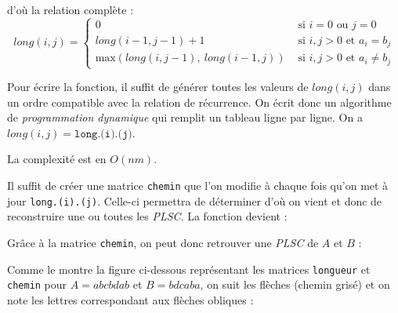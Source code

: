 d'où la relation complète :
\[
    long(i,j) = \begin{cases}
        0 & \textrm{ si } i=0 \textrm{ ou } j=0\\
        long(i-1, j-1) + 1 & \textrm{ si } i,j > 0 \textrm{ et } a_i=b_j\\
        \textrm{max}(long(i, j-1),\ long(i-1, j)) & \textrm{ si } i,j > 0 \textrm{ et } a_i \neq b_j\end{cases}
\]

Pour écrire la fonction, il suffit de générer toutes les valeurs de $long(i,j)$ dans un ordre compatible avec la relation de récurrence. On écrit donc un algorithme de \textit{programmation dynamique} qui remplit un tableau ligne par ligne. On a $long(i,j)=\texttt{long.(i).(j)}$.



La complexité est en $O(nm)$.

\Q
Il suffit de créer une matrice \texttt{chemin} que l'on modifie à chaque fois qu'on met à jour \texttt{long.(i).(j)}. Celle-ci permettra de déterminer \og d'où on vient \fg{} et donc de reconstruire une ou toutes les \textit{PLSC}. La fonction devient :



Grâce à la matrice \texttt{chemin}, on peut donc retrouver une \textit{PLSC} de $A$ et $B$ :


\bigskip

Comme le montre la figure ci-dessous représentant les matrices \texttt{longueur} et \texttt{chemin} pour $A=abcbdab$ et $B=bdcaba$, on suit les flèches (chemin grisé) et on note les lettres correspondant aux flèches obliques :

\newcommand{\CC}{\cellcolor{lightgray}}

